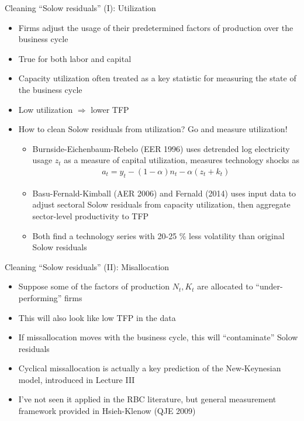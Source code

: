 \documentclass[9pt,xcolor={dvipsnames}]{beamer}
\newcommand{\bit}{\begin{itemize}}
\newcommand{\eit}{\end{itemize}}
\begin{document}
\begin{frame}{Cleaning ``Solow residuals'' (I): Utilization}

\bit
\setlength\itemsep{1em} 

\item Firms adjust the usage of their predetermined factors of production over the business cycle

\item True for both labor and capital

\item Capacity utilization often treated as a key statistic for measuring the state of the business cycle

\item Low utilization $\Rightarrow$ lower TFP

\item How to clean Solow residuals from utilization? Go and measure utilization!
\bit
\setlength\itemsep{0.5em} 
\item Burnside-Eichenbaum-Rebelo (EER 1996) uses detrended log electricity usage $z_t$ as a measure of capital utilization, measures technology shocks as
\begin{eqnarray}
a_t = y_t-(1-\alpha)n_t - \alpha (z_t + k_t) \nonumber
\end{eqnarray}

\item Basu-Fernald-Kimball (AER 2006) and Fernald (2014) uses input data to adjust sectoral Solow residuals from capacity utilization, then aggregate sector-level productivity to TFP

\item Both find a technology series with 20-25 \% less volatility than original Solow residuals
\eit

\eit

\end{frame}

\begin{frame}{Cleaning ``Solow residuals'' (II): Misallocation}

\bit
\setlength\itemsep{1em} 


\item Suppose some of the factors of production $N_t, K_t$ are allocated to ``under-performing'' firms

\item This will also look like low TFP in the data

\item If missallocation moves with the business cycle, this will ``contaminate'' Solow residuals

\item Cyclical missallocation is actually a key prediction of the New-Keynesian model, introduced in Lecture III

\item I've not seen it applied in the RBC literature, but general measurement framework provided in Hsieh-Klenow (QJE 2009) 

\eit

\end{frame}
\end{document}
